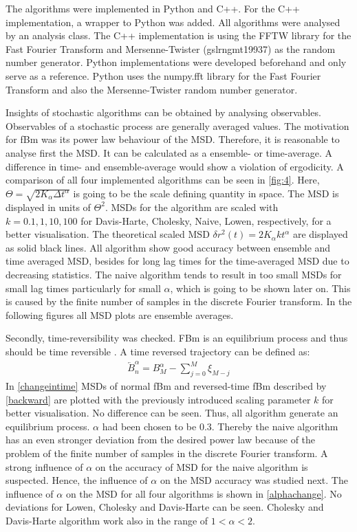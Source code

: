 \documentclass[
  a4paper,BCOR10mm,twoside,
  headsepline,footsepline,%
  fleqn,openbib
]{scrbook}
\begin{document}
The algorithms were implemented in Python and C++. For the C++ implementation, a wrapper to Python was added. All algorithms were analysed by an analysis class. The C++ implementation is using the FFTW library for the Fast Fourier Transform \cite{FFTW} and Mersenne-Twister (gsl\texttt{\textunderscore}rng\texttt{\textunderscore}mt19937) \cite{Matsumoto1998} as the random number generator. Python implementations were developed beforehand and only serve as a reference. Python uses the numpy.fft library for the Fast Fourier Transform and also the Mersenne-Twister random number generator.\par
Insights of stochastic algorithms can be obtained by analysing observables. Observables of a stochastic process are generally averaged values. The motivation for fBm was its power law behaviour of the MSD. Therefore, it is reasonable to analyse first the MSD. It can be calculated as a ensemble- or time-average. A difference in time- and ensemble-average would show a violation of ergodicity. A comparison of all four implemented algorithms can be seen in \cref{fig:4}. Here, $\Theta=\sqrt{2K_\alpha \Delta t^{\alpha}}$ is going to be the scale defining quantity in space. The MSD is displayed in units of $\Theta^2$. MSDs for the algorithm are scaled with $k=0.1,1,10,100$ for Davis-Harte, Cholesky, Naive, Lowen, respectively, for a better visualisation. The theoretical scaled MSD $\delta r^2 (t)=2 K_\alpha k t^{\alpha}$ are displayed as solid black lines. All algorithm show good accuracy between ensemble and time averaged MSD, besides for long lag times for the time-averaged MSD due to decreasing statistics. The naive algorithm tends to result in too small MSDs for small lag times particularly for small $\alpha$, which is going to be shown later on. This is caused by the finite number of samples in the discrete Fourier transform. In the following figures all MSD plots are ensemble averages.\par Secondly, time-reversibility was checked. FBm is an equilibrium process and thus should be time reversible  \cite{Horvai2007}. A time reversed trajectory can be defined as:
\begin{align} \label{backward}
 \overleftarrow{B}^{\alpha}_n=B^{\alpha}_M-\sum^M_{j=0} \xi_{M-j}
\end{align}
In \cref{changeintime}  MSDs of normal fBm and reversed-time fBm described by \cref{backward} are plotted with the previously introduced scaling parameter $k$ for better visualisation. No difference can be seen. Thus, all algorithm generate an equilibrium process. $\alpha$ had been chosen to be $0.3$. Thereby the naive algorithm has an even stronger deviation from the desired power law because of the problem of the finite number of samples in the discrete Fourier transform. A strong influence of $\alpha$ on the accuracy of MSD for the naive algorithm is suspected. Hence, the influence of $\alpha$ on the MSD accuracy was studied next. The influence of $\alpha$ on the MSD for all four algorithms is shown in \cref{alphachange}. No deviations for Lowen, Cholesky and Davis-Harte can be seen. Cholesky and Davis-Harte algorithm work also in the range of $1<\alpha<2$. 
\end{document}
